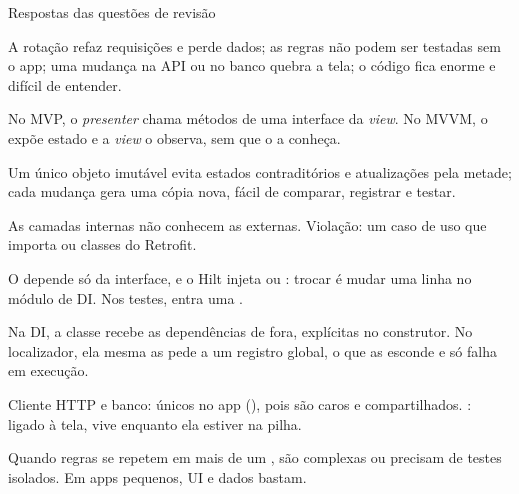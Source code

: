 \documentclass[aspectratio=169,10pt]{beamer}
\begin{document}
\begin{frame}{Respostas das questões de revisão}
  \begin{respostas}
    \item A rotação refaz requisições e perde dados; as regras não podem ser testadas sem o app; uma mudança na API ou no banco quebra a tela; o código fica enorme e difícil de entender.
    \item No MVP, o \emph{presenter} chama métodos de uma interface da \emph{view}. No MVVM, o  expõe estado e a \emph{view} o observa, sem que o  a conheça.
    \item Um único objeto imutável evita estados contraditórios e atualizações pela metade; cada mudança gera uma cópia nova, fácil de comparar, registrar e testar.
    \item As camadas internas não conhecem as externas. Violação: um caso de uso que importa  ou classes do Retrofit.
    \item O  depende só da interface, e o Hilt injeta  ou : trocar é mudar uma linha no módulo de DI. Nos testes, entra uma .
    \item Na DI, a classe recebe as dependências de fora, explícitas no construtor. No localizador, ela mesma as pede a um registro global, o que as esconde e só falha em execução.
    \item Cliente HTTP e banco: únicos no app (), pois são caros e compartilhados. : ligado à tela, vive enquanto ela estiver na pilha.
    \item Quando regras se repetem em mais de um , são complexas ou precisam de testes isolados. Em apps pequenos, UI e dados bastam.
  \end{respostas}
\end{frame}

\end{document}
